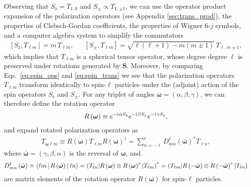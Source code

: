\documentclass[nofootinbib,twocolumn]{revtex4-1}
\newcommand{\p}[1]{\left(#1\right)} %
\renewcommand{\sp}[1]{\left[#1\right]} %
\newcommand{\bk}{\Braket} %
\renewcommand{\i}{\mathrm{i}\mkern1mu} %
\newcommand{\y}{\text{y}}
\newcommand{\z}{\text{z}}
\def\obk#1{\mathinner{({#1})}}
\begin{document}
Observing that $S_\z=T_{1,0}$ and $S_\pm\propto T_{1,\pm1}$, we can use the operator product expansion of the polarization operators (see Appendix \ref{sec:trans_prod}), the properties of Clebsch-Gordan coefficients, the properties of Wigner $6$-$j$ symbols, and a computer algebra system to simplify the commutators
\begin{align}
  \sp{S_\z,T_{\ell m}} = m\, T_{\ell m},
  &&
  \sp{S_\pm,T_{\ell m}} = \sqrt{\ell\p{\ell+1}-m\p{m\pm 1}}\, T_{\ell,m\pm1},
  \label{eq:spin_trans}
\end{align}
which implies that $T_{\ell m}$ is a spherical tensor operator, whose degree degree $\ell$ is preserved under rotations generated by $\bm S$.
Moreover, by comparing Eqs.~\eqref{eq:spin_ops} and \eqref{eq:spin_trans} we see that the polarization operators $T_{\ell m}$ transform identically to spin-$\ell$ particles under the (adjoint) action of the spin operators $S_\z$ and $S_\pm$.
For any triplet of angles $\bm\omega=\p{\alpha,\beta,\gamma}$, we can therefore define the rotation operator
\begin{align}
  R\p{\bm\omega} \equiv
  e^{-\i\alpha S_\z} e^{-\i\beta S_\y} e^{-\i\gamma S_\z},
\end{align}
and expand rotated polarization operators as
\begin{align}
  T_{\bm\omega\ell m} \equiv
  R\p{\bm\omega} T_{\ell m} R\p{\bm\omega}^\dag
  = \sum_{n=-\ell}^\ell D_{mn}^\ell\p{\bar{\bm\omega}}^* T_{\ell n},
  \label{eq:trans_rot_apndx}
\end{align}
where $\bar{\bm\omega}=\p{\gamma,\beta,\alpha}$ is the reversal of $\bm\omega$, and
\begin{align}
  D_{mn}^\ell\p{\bar{\bm\omega}}
  \equiv \bk{\ell m|R\p{\bar{\bm\omega}}|\ell n}
  = \obk{T_{\ell n} | R\p{\bm\omega}
    \otimes R\p{\bm\omega}^* |T_{\ell m}}^*
  = \obk{T_{\ell m} | R\p{-\bar{\bm\omega}}
    \otimes R\p{-\bar{\bm\omega}}^* |T_{\ell n}}
\end{align}
are matrix elements of the rotation operator $R\p{\bm\omega}$ for spin-$\ell$ particles.
\end{document}
